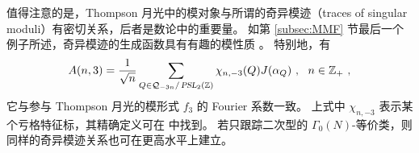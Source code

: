 值得注意的是，Thompson 月光中的模对象与所谓的奇异模迹（traces of singular moduli）有密切关系，后者是数论中的重要量。
如第 \ref{subsec:MMF} 节最后一个例子所述，奇异模迹的生成函数具有有趣的模性质 \cite{Zag_TrcSngMdl}。
特别地，有
\begin{equation}
A(n,3)=\frac{1}{\sqrt{n}}\sum_{Q\in\mathcal{Q}_{-3n}/\operatorname{\textsl{PSL}}_2(\mathbb{Z})}\chi_{n,-3}(Q)J(\alpha_Q)~,~~n\in\mathbb{Z}_+~,
\end{equation}
它与参与 Thompson 月光的模形式 $f_3$ 的 Fourier 系数一致。
上式中 $\chi_{n,-3}$ 表示某个亏格特征标，其精确定义可在 \cite{Zag_TrcSngMdl} 中找到。
若只跟踪二次型的 $\Gamma_0(N)$-等价类，则同样的奇异模迹关系也可在更高水平上建立。

